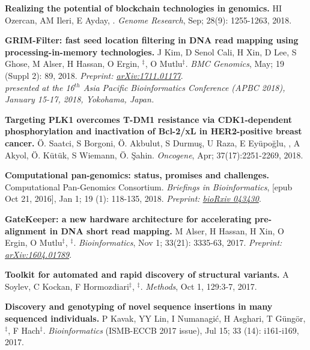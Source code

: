 \vspace{-.2cm}
    {\bf Realizing the potential of blockchain technologies in genomics.}
    HI Ozercan, AM Ileri, E Ayday, \calkan{}.
    {\em Genome Research}, Sep; 28(9): 1255-1263, 2018.

\vspace{-.2cm}
    {\bf GRIM-Filter: fast seed location filtering in DNA read mapping using processing-in-memory technologies.}
    J Kim, D Senol Cali, H Xin, D Lee, S Ghose, M Alser, H Hassan, O Ergin, \calkan{}$^\ddag$, O Mutlu$^\ddag$. {\em BMC Genomics}, May; 19 (Suppl 2): 89, 2018. \textit{Preprint: \href{https://doi.org/10.48550/arXiv.1711.01177}{arXiv:1711.01177}}. \\
    \hspace*{1cm}
    {\footnotesize \em presented at the 16$^{th}$ Asia Pacific Bioinformatics Conference (APBC 2018), January 15-17, 2018, Yokohama, Japan.}


\vspace{-.2cm}        
    {\bf Targeting PLK1 overcomes T-DM1 resistance via CDK1-dependent phosphorylation and inactivation of Bcl-2/xL in HER2-positive breast cancer.}
    Ö. Saatci, S Borgoni, Ö. Akbulut, S Durmuş, U Raza, E Eyüpoğlu, \calkan{}, A Akyol, Ö. Kütük, S Wiemann, Ö. Şahin.         
    {\em Oncogene}, Apr; 37(17):2251-2269, 2018.

\vspace{-.2cm}
    {\bf Computational pan-genomics: status, promises and challenges.}
    Computational Pan-Genomics Consortium. {\em Briefings in Bioinformatics}, [epub Oct 21, 2016], Jan 1; 19 (1): 118-135, 2018.
    \textit{Preprint: \href{https://doi.org/10.1101/043430}{bioRxiv 043430}}.
         
\vspace{-.2cm}
    {\bf GateKeeper: a new hardware architecture for accelerating pre-alignment in DNA short read mapping.} M Alser, H Hassan, H Xin, O Ergin, O Mutlu$^\ddag$, \calkan{}$^\ddag$.
    {\em Bioinformatics}, Nov 1; 33(21): 3335-63, 2017. \textit{Preprint: \href{https://doi.org/10.48550/arXiv.1604.01789}{arXiv:1604.01789}}.
    
\vspace{-.2cm}
    {\bf Toolkit for automated and rapid discovery of structural variants.}
    A Soylev, C Kockan, F Hormozdiari$^\ddag$, \calkan{}$^\ddag$.
    {\em Methods}, Oct 1, 129:3-7, 2017.
    
\vspace{-.2cm}
    {\bf Discovery and genotyping of novel sequence insertions in many sequenced individuals.}
    P Kavak, YY Lin, I Numanagić, H Asghari, T Güngör, \calkan{}$^\ddag$, F Hach$^\ddag$.
    {\em Bioinformatics} (ISMB-ECCB 2017 issue), Jul 15; 33 (14): i161-i169, 2017.\\
         
